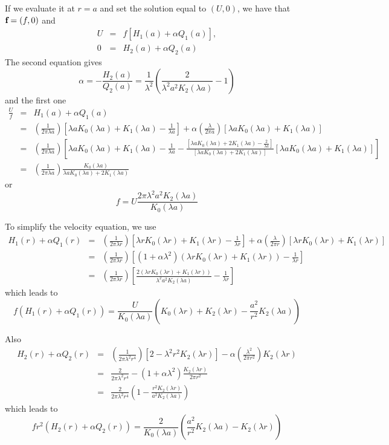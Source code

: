 \documentclass[12pt]{article}
\newcommand{\ff}{\mbox{\bf f}}
\begin{document}
If we evaluate it at $r=a$ and set the solution equal to $(U,0)$, we have that $\ff = (f,0)$ and
\begin{eqnarray}
U &=& f [ H_1(a) + \alpha Q_1(a)],  \\
0 &=& H_2(a) + \alpha Q_2(a)
\end{eqnarray}
The second equation gives
\[
\alpha = - \frac{H_2(a)}{Q_2(a)} = \frac{1}{\lambda^2} \left( \frac{2}{\lambda^2 a^2 K_2(\lambda a)} -1\right)
\]
and the first one 
\begin{eqnarray*}
\frac{U}{f}&=&H_1(a) + \alpha Q_1(a) \\
&=&\left( \frac{1}{2\pi\lambda a} \right) \left[ \lambda a K_0(\lambda a) + K_1(\lambda a) - \frac{1}{\lambda a} \right] + \alpha  \left(\frac{\lambda}{2\pi a}\right) \left[ \lambda a K_0(\lambda a) +  K_1(\lambda a) \right] \\
&=& \left( \frac{1}{2\pi\lambda a} \right) \left[ \lambda a K_0(\lambda a) + K_1(\lambda a) - \frac{1}{\lambda a}   -\frac{
 \left[ \lambda a K_0(\lambda a) +2 K_1(\lambda a) - \frac{2}{\lambda a} \right] }{
 \left[ \lambda a K_0(\lambda a) +  2 K_1(\lambda a) \right] }  \left[ \lambda a K_0(\lambda a) +  K_1(\lambda a) \right] \right] \\
 &=& \left(\frac{1}{2\pi\lambda a}\right) \frac{ K_0(\lambda a)}{ \lambda a K_0(\lambda a) + 2 K_1(\lambda a)} 
\end{eqnarray*}
or
\[
f = U \frac{ 2\pi\lambda^2 a^2  K_2(\lambda a)}{K_0(\lambda a)}
\]

To simplify the velocity equation, we use
\begin{eqnarray*}
H_1(r) + \alpha Q_1(r) &=&  \left( \frac{1}{2\pi\lambda r} \right) \left[ \lambda r K_0(\lambda r) + K_1(\lambda r) - \frac{1}{\lambda r} \right] + \alpha \left(\frac{\lambda}{2\pi r}\right) \left[ \lambda r K_0(\lambda r) +  K_1(\lambda r) \right] \\
&=&  \left( \frac{1}{2\pi\lambda r} \right) \left[ (1+\alpha\lambda^2) (\lambda r K_0(\lambda r) + K_1(\lambda r)) - \frac{1}{\lambda r} \right]  \\
&=&  \left( \frac{1}{2\pi\lambda r} \right) \left[ \frac{2(\lambda r K_0(\lambda r) + K_1(\lambda r))}{\lambda^2 a^2 K_2(\lambda a)}  - \frac{1}{\lambda r} \right]
\end{eqnarray*}
which leads to
\[
f ( H_1(r) + \alpha Q_1(r) ) = \frac{U}{K_0(\lambda a)} \left( K_0(\lambda r) + K_2(\lambda r) - \frac{a^2}{r^2}K_2(\lambda a) \right)
\]

Also
\begin{eqnarray*}
H_2(r) + \alpha Q_2(r) &=& \left( \frac{1}{2\pi\lambda^2 r^4} \right) \left[ 2- \lambda^2 r^2 K_2(\lambda r)  \right]
- \alpha \left(\frac{\lambda^2}{2\pi r^2}\right)  K_2(\lambda r) \\
&=&  \frac{2}{2\pi\lambda^2 r^4} - (1+\alpha\lambda^2) \frac{K_2(\lambda r)}{2\pi r^2} \\
&=&  \frac{2}{2\pi\lambda^2 r^4} \left( 1 - \frac{r^2 K_2(\lambda r)}{ a^2 K_2(\lambda a)}  \right)
\end{eqnarray*}
which leads to
\[f r^2 ( H_2(r) + \alpha Q_2(r) ) = \frac{2}{K_0(\lambda a)}\left( \frac{a^2}{r^2} K_2(\lambda a) - K_2(\lambda r) \right)
\]
\end{document}
